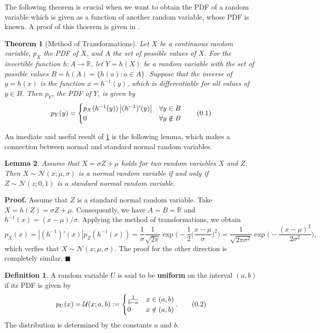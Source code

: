 \documentclass[10pt]{article}
\newtheorem{thm}{Theorem}[section]
\newtheorem{lem}[thm]{Lemma}
\theoremstyle{definition}
\newtheorem{defn}{Definition}[section]
\newenvironment{prf}{\noindent\textbf{Proof.}}{\hfill$\blacksquare$}
\newcommand\eqnum{\addtocounter{equation}{1}\tag{\arabic{section}.\arabic{equation}}}
\begin{document}
The following theorem is crucial when we want to obtain the PDF of a random variable which is given as a function of another random variable, whose PDF is known. A proof of this thoerem is given in \cite{Gharamani2019}.
\begin{thm}[Method of Transformations]\label{thm:MT}
Let $X$ be a continuous random variable, $p_X$ the PDF of $X$, and $A$ the set of possible values of $X$. For the invertible function $h:A\to\mathbb{R}$, let $Y=h(X)$ be a random variable with the set of possible values $B=h(A)=\{h(a): a\in A\}$. Suppose that the inverse of $y=h(x)$ is the function $x=h^{-1}(y)$, which is differentiable for all values of $y\in B$. Then $p_Y$, the PDF of $Y$, is given by
\begin{equation*}
p_Y(y) = 
\begin{cases}
p_X(h^{-1}(y))\left|(h^{-1})'(y)\right| & \forall y \in B  \\
0 & \forall y \notin B 
\end{cases}
\eqnum
\end{equation*}
\end{thm}
\noindent
An imediate and useful result of \cref{thm:MT} is the following lemma, which makes a connection between normal and standard normal random variables.
\begin{lem}
Assume that $X=\sigma Z + \mu$ holds for two random variables $X$ and $Z$. Then $X\sim\mathcal{N}(x; \mu, \sigma)$ is a normal random variable if and only if $Z\sim\mathcal{N}(z; 0, 1)$  is a standard normal random variable.
\end{lem}
\begin{prf}
Assume that $Z$ is a standard normal random variable. Take $X=h(Z)=\sigma Z + \mu$. Consequently, we have $A=B=\mathbb{R}$ and $h^{-1}(x)=(x-\mu)/\sigma$. Applying the method of transformations, we obtain
\begin{equation*}
p_X(x)=|(h^{-1})'(x)|p_Z(h^{-1}(x))
=\frac{1}{\sigma}\frac{1}{\sqrt{2\pi}}\exp\Big(-\frac{1}{2}\Big(\frac{x-\mu}{\sigma}\Big)^2\Big)
=\frac{1}{\sqrt{2\pi\sigma^2}}\exp\Big(-\frac{(x-\mu)^2}{2\sigma^2}\Big),
\end{equation*}
which verfies that  $X\sim\mathcal{N}(x; \mu, \sigma)$. The proof for the other direction is completely similar.
\end{prf}
\begin{defn}
A random variable $U$ is said to be \textbf{uniform} on the interval $(a, b)$ if its PDF is given by
\begin{equation*}
p_U(x) = \mathcal{U}(x; a, b) :=
\begin{cases} 
\frac{1}{b-a} & x \in (a, b) \\
0 & x \notin (a, b)
\end{cases}.
\eqnum
\end{equation*}
The distribution is determined by the constants $a$ and $b$. 
\end{defn}
\end{document}
